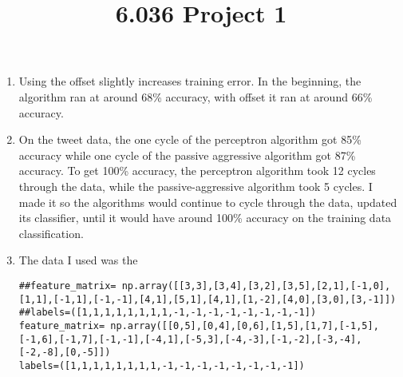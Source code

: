\documentclass[12pt,twoside]{article}
\title{6.036 Project 1}
\begin{document}
\begin{problems}
\begin{enumerate}
\problem \item Using the offset slightly increases training error.  In the beginning, the algorithm ran at around 68\% accuracy, with offset it ran at around 66\% accuracy.  
\problem \item On the tweet data, the one cycle of the perceptron algorithm got 85\% accuracy while one cycle of the passive aggressive algorithm got 87\% accuracy.  To get 100\% accuracy, the perceptron algorithm took 12 cycles through the data, while the passive-aggressive algorithm took 5 cycles.  I made it so the algorithms would continue to cycle through the data, updated its classifier, until it would have around 100\% accuracy on the training data classification.
\problem \item The data I used was the \begin{verbatim} 
##feature_matrix= np.array([[3,3],[3,4],[3,2],[3,5],[2,1],[-1,0],
[1,1],[-1,1],[-1,-1],[4,1],[5,1],[4,1],[1,-2],[4,0],[3,0],[3,-1]])
##labels=([1,1,1,1,1,1,1,1,-1,-1,-1,-1,-1,-1,-1,-1])
feature_matrix= np.array([[0,5],[0,4],[0,6],[1,5],[1,7],[-1,5],
[-1,6],[-1,7],[-1,-1],[-4,1],[-5,3],[-4,-3],[-1,-2],[-3,-4],[-2,-8],[0,-5]])
labels=([1,1,1,1,1,1,1,1,-1,-1,-1,-1,-1,-1,-1,-1]) \end{verbatim} \\


\end{enumerate}
\end{problems}
\end{document}
